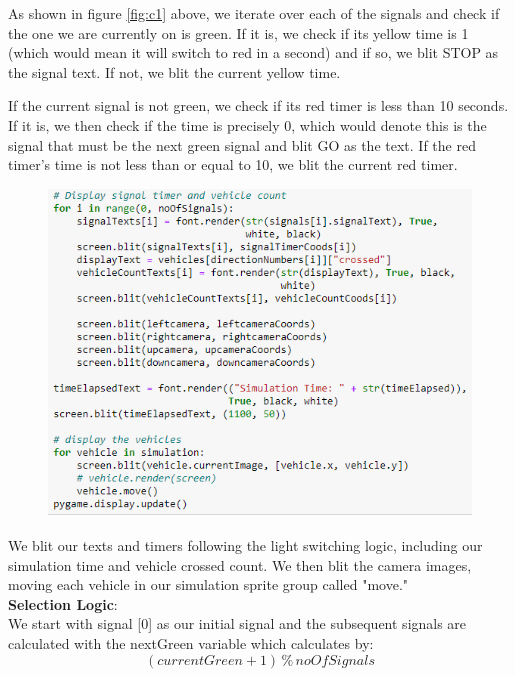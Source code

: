 \documentclass[12pt, a4paper,titlepage]{article}
\begin{document}
As shown in figure \ref{fig:c1} above, we iterate over each of the signals and check if the one we are currently on is green. If it is, we check if its yellow time is 1 (which would mean it will switch to red in a second) and if so, we blit STOP as the signal text. If not, we blit the current yellow time.

If the current signal is not green, we check if its red timer is less than 10 seconds. If it is, we then check if the time is precisely 0, which would denote this is the signal that must be the next green signal and blit GO as the text. If the red timer's time is not less than or equal to 10, we blit the current red timer.

\begin{figure}[H]
	\centering
	\includegraphics[width=\linewidth]{images/c2}
	\caption{}
	\label{fig:c2}
\end{figure}

We blit our texts and timers following the light switching logic, including our simulation time and vehicle crossed count. We then blit the camera images, moving each vehicle in our simulation sprite group called "move."\\

\textbf{Selection Logic}:\\

We start with signal [0] as our initial signal and the subsequent signals are calculated with the nextGreen variable which calculates by:
\begin{equation}\label{key}
	 (currentGreen+1) \, \% \, noOfSignals
\end{equation}
\end{document}
